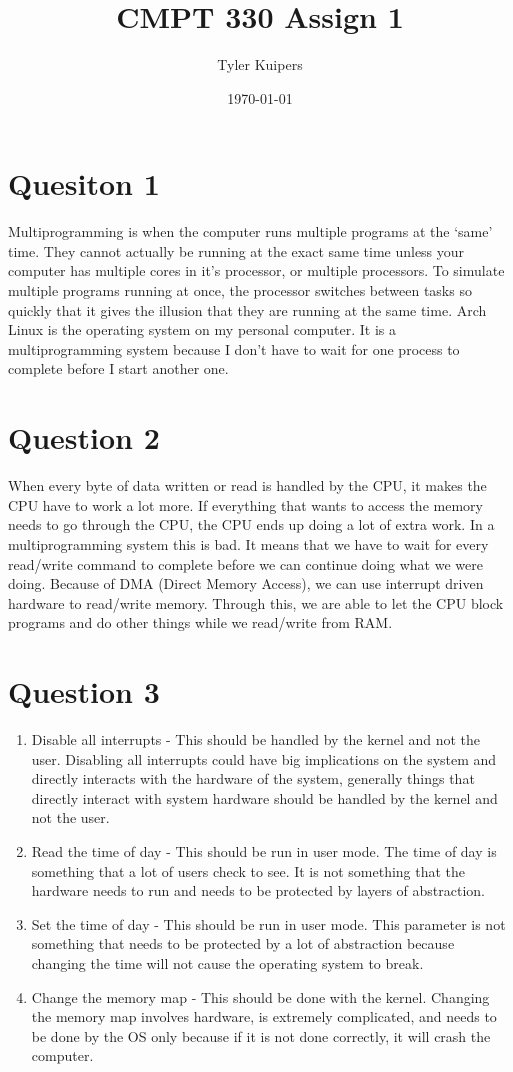 \documentclass[12pt]{extarticle}
\title{CMPT 330 Assign 1}
\author{Tyler Kuipers}
\date{\today}
\begin{document}
	\maketitle

	\section*{Quesiton 1}
		Multiprogramming is when the computer runs multiple programs at the `same' time.  They cannot actually be running at the exact same time unless your computer has multiple cores in it's processor, or multiple processors.  To simulate multiple programs running at once, the processor switches between tasks so quickly that it gives the illusion that they are running at the same time.  Arch Linux is the operating system on my personal computer.  It is a multiprogramming system because I don't have to wait for one process to complete before I start another one.

	\section*{Question 2}
		When every byte of data written or read is handled by the CPU, it makes the CPU have to work a lot more.  If everything that wants to access the memory needs to go through the CPU, the CPU ends up doing a lot of extra work.  In a multiprogramming system this is bad.  It means that we have to wait for every read/write command to complete before we can continue doing what we were doing.  Because of DMA (Direct Memory Access), we can use interrupt driven hardware to read/write memory.  Through this, we are able to let the CPU block programs and do other things while we read/write from RAM.

	\section*{Question 3}  
		\begin{enumerate}
			\item Disable all interrupts - This should be handled by the kernel and not the user.  Disabling all interrupts could have big implications on the system and directly interacts with the hardware of the system, generally things that directly interact with system hardware should be handled by the kernel and not the user.
			\item Read the time of day - This should be run in user mode.  The time of day is something that a lot of users check to see.  It is not something that the hardware needs to run and needs to be protected by layers of abstraction.
			\item Set the time of day - This should be run in user mode.  This parameter is not something that needs to be protected by a lot of abstraction because changing the time will not cause the operating system to break.
			\item Change the memory map - This should be done with the kernel.  Changing the memory map involves hardware, is extremely complicated, and needs to be done by the OS only because if it is not done correctly, it will crash the computer. 
		\end{enumerate}
\end{document}
